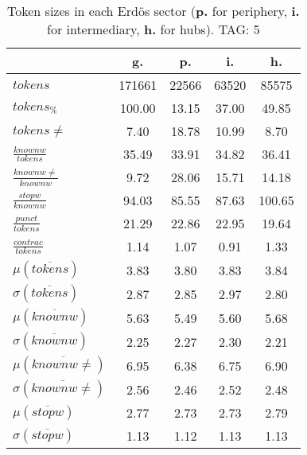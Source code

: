 \begin{table}[h!]
\begin{center}
\begin{tabular}{| l || c | c | c | c |}\hline
 & {\bf g.} & {\bf p.} & {\bf i.} & {\bf h.} \\\hline\hline
$tokens$ & 171661  & 22566  & 63520  & 85575 \\
$tokens_{\%}$ & 100.00  & 13.15  & 37.00  & 49.85 \\
$tokens \neq$ & 7.40  & 18.78  & 10.99  & 8.70 \\\hline
$\frac{knownw}{tokens}$ & 35.49  & 33.91  & 34.82  & 36.41 \\
$\frac{knownw \neq}{knownw}$ & 9.72  & 28.06  & 15.71  & 14.18 \\\hline
$\frac{stopw}{knownw}$ & 94.03  & 85.55  & 87.63  & 100.65 \\
$\frac{punct}{tokens}$ & 21.29  & 22.86  & 22.95  & 19.64 \\
$\frac{contrac}{tokens}$ & 1.14  & 1.07  & 0.91  & 1.33 \\\hline\hline
$\mu(\overline{tokens})$ & 3.83  & 3.80  & 3.83  & 3.84 \\
$\sigma(\overline{tokens})$ & 2.87  & 2.85  & 2.97  & 2.80 \\\hline
$\mu(\overline{knownw})$ & 5.63  & 5.49  & 5.60  & 5.68 \\
$\sigma(\overline{knownw})$ & 2.25  & 2.27  & 2.30  & 2.21 \\\hline
$\mu(\overline{knownw \neq})$ & 6.95  & 6.38  & 6.75  & 6.90 \\
$\sigma(\overline{knownw \neq})$ & 2.56  & 2.46  & 2.52  & 2.48 \\\hline
$\mu(\overline{stopw})$ & 2.77  & 2.73  & 2.73  & 2.79 \\
$\sigma(\overline{stopw})$ & 1.13  & 1.12  & 1.13  & 1.13 \\\hline
\end{tabular}
\caption{Token sizes in each Erd\"os sector ({{\bf p.}} for periphery, {{\bf i.}} for intermediary, {{\bf h.}} for hubs). TAG: 5}
\end{center}
\end{table}